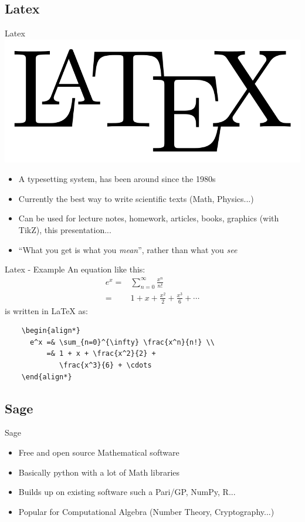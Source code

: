 \documentclass[11pt]{beamer}
\begin{document}
\subsection{Latex}
\begin{frame}{Latex}
  \includegraphics[scale=0.1]{img/latex.png}
  \begin{itemize}
    \item A typesetting system, has been around since the 1980s
    \item Currently the best way to write scientific texts (Math, Physics...)
    \item Can be used for lecture notes, homework, articles, books, graphics
          (with TikZ), this presentation...%
    \item ``What you get is what you \emph{mean}'', rather than what you
          \emph{see}
  \end{itemize}
\end{frame}

\begin{frame}[fragile]{Latex - Example}
  An equation like this:
  \begin{align*}
    e^x =& \sum_{n=0}^{\infty} \frac{x^n}{n!} \\
        =& 1 + x + \frac{x^2}{2} + \frac{x^3}{6} + \cdots
  \end{align*}
  is written in LaTeX as:
  \begin{verbatim}
    \begin{align*}
      e^x =& \sum_{n=0}^{\infty} \frac{x^n}{n!} \\
          =& 1 + x + \frac{x^2}{2} +
             \frac{x^3}{6} + \cdots
    \end{align*}
  \end{verbatim}
\end{frame}

\subsection{Sage}
\begin{frame}{Sage}
  
  \begin{itemize}
    \item Free and open source Mathematical software
    \item Basically python with a lot of Math libraries
    \item Builds up on existing software such a Pari/GP, NumPy, R...
    \item Popular for Computational Algebra (Number Theory, Cryptography...)
  \end{itemize}
\end{frame}
\end{document}
